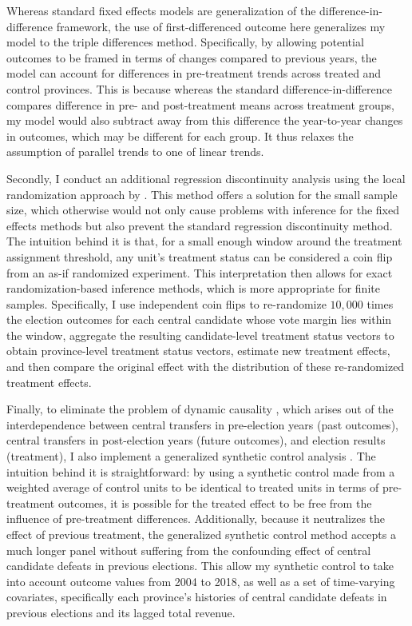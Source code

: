 \documentclass[12pt]{article}
\newcommand{\1}{\mathbbm{1}}
\begin{document}
Whereas standard fixed effects models are generalization of the difference-in-difference framework, the use of first-differenced outcome here generalizes my model to the triple differences method. Specifically, by allowing potential outcomes to be framed in terms of changes compared to previous years, the model can account for differences in pre-treatment trends across treated and control provinces. This is because whereas the standard difference-in-difference compares difference in pre- and post-treatment means across treatment groups, my model would also subtract away from this difference the year-to-year changes in outcomes, which may be different for each group. It thus relaxes the assumption of parallel trends to one of linear trends.

Secondly, I conduct an additional regression discontinuity analysis using the local randomization approach by \citet{CattaneoTitiunik2015}. This method offers a solution for the small sample size, which otherwise would not only cause problems with inference for the fixed effects methods but also prevent the standard regression discontinuity method. The intuition behind it is that, for a small enough window around the treatment assignment threshold, any unit's treatment status can be considered a coin flip from an as-if randomized experiment. This interpretation then allows for exact randomization-based inference methods, which is more appropriate for finite samples. Specifically, I use independent coin flips to re-randomize $10,000$ times the election outcomes for each central candidate whose vote margin lies within the window, aggregate the resulting candidate-level treatment status vectors to obtain province-level treatment status vectors, estimate new treatment effects, and then compare the original effect with the distribution of these re-randomized treatment effects.

Finally, to eliminate the problem of dynamic causality \citep{ImaiKim2019}, which arises out of the interdependence between central transfers in pre-election years (past outcomes), central transfers in post-election years (future outcomes), and election results (treatment), I also implement a generalized synthetic control analysis \citep{Xu2017gsynth}. The intuition behind it is straightforward: by using a synthetic control made from a weighted average of control units to be identical to treated units in terms of pre-treatment outcomes, it is possible for the treated effect to be free from the influence of pre-treatment differences. Additionally, because it neutralizes the effect of previous treatment, the generalized synthetic control method accepts a much longer panel without suffering from the confounding effect of central candidate defeats in previous elections. This allow my synthetic control to take into account outcome values from 2004 to 2018, as well as a set of time-varying covariates, specifically each province's histories of central candidate defeats in previous elections and its lagged total revenue.
\end{document}
